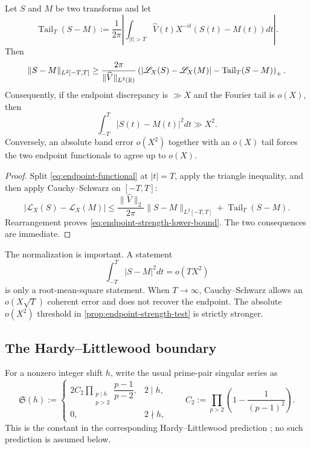 \begin{proposition}
\label{prop:endpoint-strength-test}
Let $S$ and $M$ be two transforms and let
\begin{equation}
 \operatorname{Tail}_T(S-M)
 :=\frac1{2\pi}
 \left|\int_{|t|>T}\widehat V(t)X^{-it}(S(t)-M(t))dt\right|.
 \label{eq:model-tail}
\end{equation}
Then
\begin{equation}
 \|S-M\|_{L^2[-T,T]}
 \geq\frac{2\pi}{\|\widehat V\|_{L^2(\mathbb R)}}
 \left(
 |\mathscr L_X(S)-\mathscr L_X(M)|
 -\operatorname{Tail}_T(S-M)
 \right)_+.
 \label{eq:endpoint-strength-lower-bound}
\end{equation}
Consequently, if the endpoint discrepancy is $\gg X$ and the Fourier tail
is $o(X)$, then
\begin{equation}
 \int_{-T}^{T}|S(t)-M(t)|^2dt\gg X^2.
 \label{eq:endpoint-X2-floor}
\end{equation}
Conversely, an absolute band error $o(X^2)$ together with an $o(X)$ tail
forces the two endpoint functionals to agree up to $o(X)$.
\end{proposition}

\begin{proof}
Split \eqref{eq:endpoint-functional} at $|t|=T$, apply the triangle
inequality, and then apply Cauchy--Schwarz on $[-T,T]$:
\[
 |\mathscr L_X(S)-\mathscr L_X(M)|
 \leq\frac{\|\widehat V\|_2}{2\pi}
 \|S-M\|_{L^2[-T,T]}
 +\operatorname{Tail}_T(S-M).
\]
Rearrangement proves \eqref{eq:endpoint-strength-lower-bound}.  The two
consequences are immediate.
\end{proof}

The normalization is important.  A statement
\[
 \int_{-T}^{T}|S-M|^2dt=o(TX^2)
\]
is only a root-mean-square statement.  When $T\to\infty$, Cauchy--Schwarz
allows an $o(X\sqrt T)$ coherent error and does not recover the endpoint.
The absolute $o(X^2)$ threshold in
\cref{prop:endpoint-strength-test} is strictly stronger.

\subsection{The Hardy--Littlewood boundary}

For a nonzero integer shift $h$, write the usual prime-pair singular
series as
\begin{equation}
 \mathfrak S(h):=
 \begin{cases}
  2C_2\displaystyle\prod_{\substack{p\mid h\\p>2}}
  \dfrac{p-1}{p-2},&2\mid h,\\[0.8em]
  0,&2\nmid h,
 \end{cases}
 \qquad
 C_2:=\prod_{p>2}\left(1-\frac1{(p-1)^2}\right).
 \label{eq:prime-pair-singular-series}
\end{equation}
This is the constant in the corresponding Hardy--Littlewood prediction
\citep{HardyLittlewood1923}; no such prediction is assumed below.

